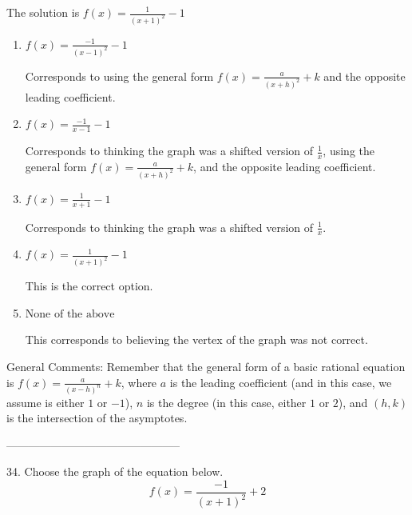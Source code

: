 \documentclass{article}[14pt]
\begin{document}
The solution is $ f(x) = \frac{1}{(x + 1)^2} - 1 $ 

\begin{enumerate}[label=\Alph*.] 
\item $ f(x) = \frac{-1}{(x - 1)^2} - 1 $ 

 Corresponds to using the general form $f(x) = \frac{a}{(x+h)^2}+k$ and the opposite leading coefficient. 
\item $ f(x) = \frac{-1}{x - 1} - 1 $ 

 Corresponds to thinking the graph was a shifted version of $\frac{1}{x}$, using the general form $f(x) = \frac{a}{(x+h)^2}+k$, and the opposite leading coefficient. 
\item $ f(x) = \frac{1}{x + 1} - 1 $ 

 Corresponds to thinking the graph was a shifted version of $\frac{1}{x}$. 
\item $ f(x) = \frac{1}{(x + 1)^2} - 1 $ 

 This is the correct option. 
\item $ \text{None of the above} $ 

 This corresponds to believing the vertex of the graph was not correct. 
\end{enumerate} 
 
General Comments: Remember that the general form of a basic rational equation is $ f(x) = \frac{a}{(x-h)^n} + k$, where $a$ is the leading coefficient (and in this case, we assume is either $1$ or $-1$), $n$ is the degree (in this case, either $1$ or $2$), and $(h, k)$ is the intersection of the asymptotes.

-----------------------------------------------

34. Choose the graph of the equation below.
$$ f(x) = \frac{-1}{(x + 1)^2} + 2 $$ 
\end{document}
